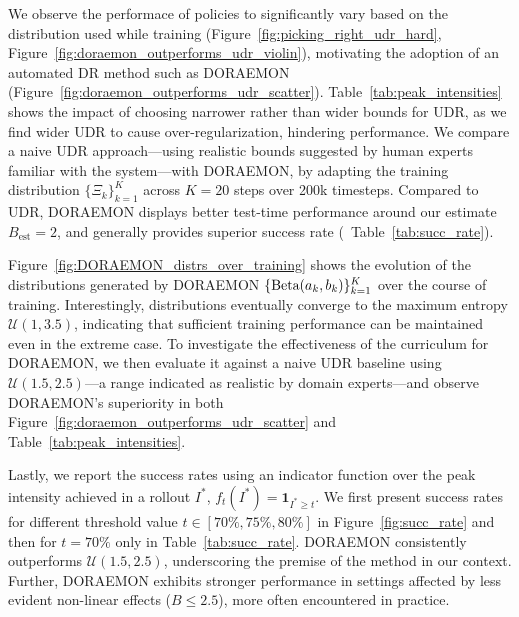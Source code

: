 We observe the performace of policies to significantly vary based on the distribution used while training (Figure~\ref{fig:picking_right_udr_hard}, Figure~\ref{fig:doraemon_outperforms_udr_violin}), motivating the adoption of an automated DR method such as DORAEMON (Figure~\ref{fig:doraemon_outperforms_udr_scatter}).
Table~\ref{tab:peak_intensities} shows the impact of choosing narrower rather than wider bounds for UDR, as we find wider UDR to cause over-regularization, hindering performance.
We compare a naive UDR approach---using realistic bounds suggested by human experts familiar with the system---with DORAEMON, by adapting the training distribution \( \{ \Xi_{k} \}_{k=1}^K\) across \( K=20 \) steps over 200k timesteps. Compared to UDR, DORAEMON displays better test-time performance around our estimate \( B_{\text{est}} = 2 \), and generally provides superior success rate (~Table~\ref{tab:succ_rate}).

Figure~\ref{fig:DORAEMON_distrs_over_training} shows the evolution of the distributions generated by DORAEMON \(\{\text{Beta}(a_k, b_k) \}_{k=1}^{K} \) over the course of training. Interestingly, distributions eventually converge to the maximum entropy \( \mathcal U(1, 3.5) \), indicating that sufficient training performance can be maintained even in the extreme case. To investigate the effectiveness of the curriculum for DORAEMON, we then evaluate it against a naive UDR baseline using \( \mathcal U(1.5, 2.5) \)---a range indicated as realistic by domain experts---and observe DORAEMON's superiority in both Figure~\ref{fig:doraemon_outperforms_udr_scatter} and Table~\ref{tab:peak_intensities}.

Lastly, we report the success rates using an indicator function over the peak intensity achieved in a rollout \( I^* \), \(f_t(I^*) = \mathbf{1}_{I^* \geq t} \). We first present success rates for different threshold value \( t \in [70\%, 75\%, 80\%] \) in Figure~\ref{fig:succ_rate} and then for \( t = 70\% \) only in Table~\ref{tab:succ_rate}.
DORAEMON consistently outperforms \( \mathcal{U}(1.5, 2.5) \), underscoring the premise of the method in our context. Further, DORAEMON exhibits stronger performance in settings affected by less evident non-linear effects (\( B \leq 2.5 \)), more often encountered in practice.

